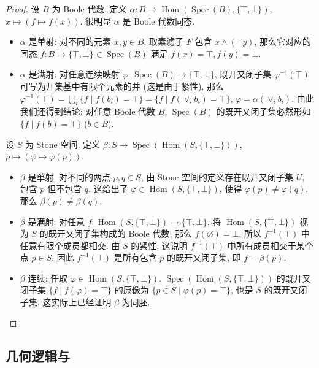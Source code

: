 \begin{proof}
	设 $B$ 为 Boole 代数. 定义 $\alpha\colon B\to\operatorname{Hom}(\operatorname{Spec}(B),\{\top,\bot\})$, $x\mapsto (f\mapsto f(x))$. 很明显 $\alpha$ 是 Boole 代数同态.
	\begin{itemize}
		\item $\alpha$ 是单射: 对不同的元素 $x,y\in B$, 取素滤子 $F$ 包含 $x\land (\neg y)$, 那么它对应的同态 $f\colon B\to\{\top,\bot\}\in\operatorname{Spec}(B)$ 满足 $f(x)=\top,f(y)=\bot$.
		\item $\alpha$ 是满射: 对任意连续映射 $\varphi\colon \operatorname{Spec}(B)\to\{\top,\bot\}$, 既开又闭子集 $\varphi^{-1}(\top)$ 可写为开集基中有限个元素的并 (这是由于紧性), 那么 $\varphi^{-1}(\top) =\bigcup_i \{f\mid f(b_i)=\top\} = \{f\mid f(\lor_i b_i)=\top\}$, $\varphi=\alpha(\lor_i b_i)$. 由此我们还得到结论: 对任意 Boole 代数 $B$, $\operatorname{Spec} (B)$ 的既开又闭子集必然形如 $\{f\mid f(b)=\top\}$ ($b\in B$).
	\end{itemize}
	设 $S$ 为 Stone 空间. 定义 $\beta\colon S\to\operatorname{Spec}(\operatorname{Hom}(S,\{\top,\bot\}))$, $p\mapsto (\varphi\mapsto \varphi(p))$.
	\begin{itemize}
		\item $\beta$ 是单射:
		对不同的两点 $p,q\in S$, 由 Stone 空间的定义存在既开又闭子集 $U$, 包含 $p$ 但不包含 $q$. 这给出了 $\varphi\in\operatorname{Hom}(S,\{\top,\bot\})$, 使得 $\varphi(p)\neq\varphi(q)$, 那么 $\beta(p)\neq\beta(q)$.
		\item $\beta$ 是满射:
		对任意 $f\colon \operatorname{Hom}(S,\{\top,\bot\}) \to \{\top,\bot\}$,
		将 $\operatorname{Hom}(S,\{\top,\bot\})$ 视为 $S$ 的既开又闭子集构成的 Boole 代数,
		那么 $f(\varnothing)=\bot$, 所以 $f^{-1}(\top)$ 中任意有限个成员都相交.
		由 $S$ 的紧性, 这说明 $f^{-1}(\top)$ 中所有成员相交于某个点 $p\in S$. 因此 $f^{-1}(\top)$ 是所有包含 $p$ 的既开又闭子集, 即 $f=\beta(p)$.
		\item $\beta$ 连续:
		任取 $\varphi\in \operatorname{Hom}(S,\{\top,\bot\})$.
		$\operatorname{Spec}(\operatorname{Hom}(S,\{\top,\bot\}))$ 的既开又闭子集 $\{f\mid f(\varphi)=\top\}$ 的原像为
		$\{p\in S\mid \varphi(p)=\top\}$, 也是 $S$ 的既开又闭子集. 这实际上已经证明 $\beta$ 为同胚.
	\end{itemize}
\end{proof}


\subsection{几何逻辑与\fm{}}

